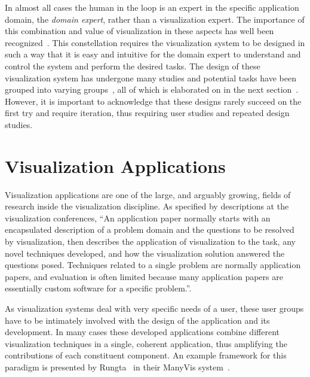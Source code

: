 In almost all cases the human in the loop is an expert in the specific application domain, the \emph{domain expert}, rather than a visualization expert.  The importance of this combination and value of visualization in these aspects has well been recognized~\cite{van2005value}.  This constellation requires the visualization system to be designed in such a way that it is easy and intuitive for the domain expert to understand and control the system and perform the desired tasks.  The design of these visualization system has undergone many studies and potential tasks have been grouped into varying groups~\cite{brehmer2014visualizing}, all of which is elaborated on in the next section~\cite{munzner2014visualization}.  However, it is important to acknowledge that these designs rarely succeed on the first try and require iteration, thus requiring user studies and repeated design studies.

\section{Visualization Applications} \label{cha:intro:appl}
Visualization applications are one of the large, and arguably growing, fields of research inside the visualization discipline.  As specified by descriptions at the visualization conferences, ``An application paper normally starts with an encapsulated description of a problem domain and the questions to be resolved by visualization, then describes the application of visualization to the task, any novel techniques developed, and how the visualization solution answered the questions posed. Techniques related to a single problem are normally application papers, and evaluation is often limited because many application papers are essentially custom software for a specific problem.''.

As visualization systems deal with very specific needs of a user, these user groups have to be intimately involved with the design of the application and its development.  In many cases these developed applications combine different visualization techniques in a single, coherent application, thus amplifying the contributions of each constituent component.  An example framework for this paradigm is presented by Rungta \etal\ in their ManyVis system~\cite{rungta2013manyvis}.

